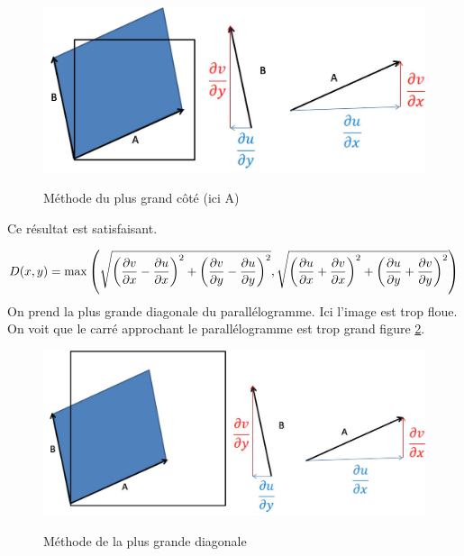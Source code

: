 \begin{figure}[h!]
\centering
\caption{Méthode du plus grand côté (ici A)}
\includegraphics[scale=0.5]{methode_plus_grand_cote.jpg}
\label{methode_plus_grand_cote}
\end{figure}


Ce résultat est satisfaisant.


$$D(x,y) = \max \left( \sqrt{\left(\frac{\partial v}{\partial x}-\frac{\partial  u}{\partial  x}\right)^2+\left(\frac{\partial v}{\partial y}-\frac{\partial  u}{\partial y}\right)^2}, \sqrt{\left(\frac{\partial u}{\partial x}+\frac{\partial  v}{\partial  x}\right)^2+\left(\frac{\partial u}{\partial y}+\frac{\partial  v}{\partial  y}\right)^2} \right)$$
On prend la plus grande diagonale du parallélogramme. Ici l'image est trop floue. On voit que le carré approchant le parallélogramme est trop grand figure \ref{methode_grande_diagonale}.

\begin{figure}[h!]
\centering
\caption{Méthode de la plus grande diagonale}
\includegraphics[scale=0.5]{methode_grande_diagonale.jpg}
\label{methode_grande_diagonale}
\end{figure}



